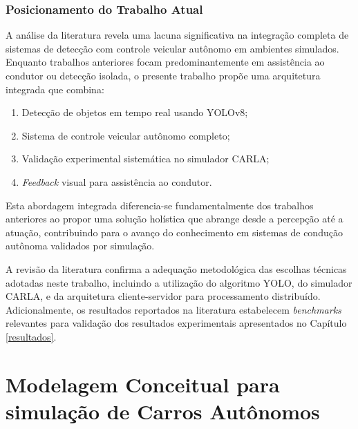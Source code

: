 \subsection{Posicionamento do Trabalho Atual}

A análise da literatura revela uma lacuna significativa na integração completa de sistemas de detecção com controle veicular autônomo em ambientes simulados. Enquanto trabalhos anteriores focam predominantemente em assistência ao condutor ou detecção isolada, o presente trabalho propõe uma arquitetura integrada que combina:

\begin{enumerate}
\item Detecção de objetos em tempo real usando YOLOv8;
\item Sistema de controle veicular autônomo completo;
\item Validação experimental sistemática no simulador CARLA;
\item \textit{Feedback} visual para assistência ao condutor.
\end{enumerate}

Esta abordagem integrada diferencia-se fundamentalmente dos trabalhos anteriores ao propor uma solução holística que abrange desde a percepção até a atuação, contribuindo para o avanço do conhecimento em sistemas de condução autônoma validados por simulação.

A revisão da literatura confirma a adequação metodológica das escolhas técnicas adotadas neste trabalho, incluindo a utilização do algoritmo YOLO, do simulador CARLA, e da arquitetura cliente-servidor para processamento distribuído. Adicionalmente, os resultados reportados na literatura estabelecem \textit{benchmarks} relevantes para validação dos resultados experimentais apresentados no Capítulo \ref{resultados}.

\chapter{Modelagem Conceitual para simulação de Carros Autônomos} \label{ModelagemConceitual}

